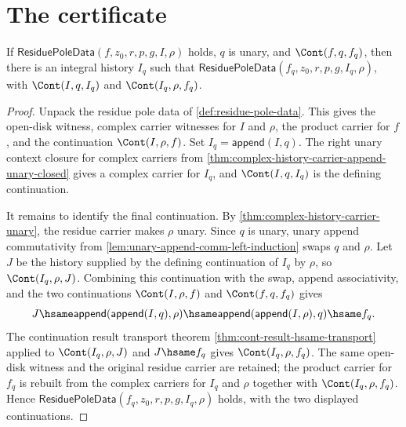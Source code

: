 \section{The certificate}
\label{sec:residue-certificate}

\begin{theorem}
\label{thm:residue-pole-data-integral-suffix-closure}
If $\mathsf{ResiduePoleData}(f,z_0,r,p,g,I,\rho)$ holds, $q$ is unary,
and $\Cont(f,q,f_q)$, then there is an integral history $I_q$ such that
$\mathsf{ResiduePoleData}(f_q,z_0,r,p,g,I_q,\rho)$, with
$\Cont(I,q,I_q)$ and $\Cont(I_q,\rho,f_q)$.
\end{theorem}
\begin{proof}
Unpack the residue pole data of \autoref{def:residue-pole-data}. This gives the
open-disk witness, complex carrier witnesses for $I$ and $\rho$, the product
carrier for $f$, and the continuation $\Cont(I,\rho,f)$. Set
$I_q=\mathsf{append}(I,q)$. The right unary context closure for complex carriers
from \autoref{thm:complex-history-carrier-append-unary-closed} gives a complex
carrier for $I_q$, and $\Cont(I,q,I_q)$ is the defining continuation.

It remains to identify the final continuation. By
\autoref{thm:complex-history-carrier-unary}, the residue carrier makes $\rho$
unary. Since $q$ is unary, unary append commutativity from
\autoref{lem:unary-append-comm-left-induction} swaps $q$ and $\rho$. Let $J$ be
the history supplied by the defining continuation of $I_q$ by $\rho$, so
$\Cont(I_q,\rho,J)$. Combining this continuation with the swap, append
associativity, and the two continuations $\Cont(I,\rho,f)$ and $\Cont(f,q,f_q)$
gives
$$
J
\hsame
\mathsf{append}(\mathsf{append}(I,q),\rho)
\hsame
\mathsf{append}(\mathsf{append}(I,\rho),q)
\hsame f_q.
$$
The continuation result transport theorem
\autoref{thm:cont-result-hsame-transport} applied to $\Cont(I_q,\rho,J)$ and
$J\hsame f_q$ gives $\Cont(I_q,\rho,f_q)$. The same open-disk witness and the
original residue carrier are retained; the product carrier for $f_q$ is rebuilt
from the complex carriers for $I_q$ and $\rho$ together with
$\Cont(I_q,\rho,f_q)$. Hence
$\mathsf{ResiduePoleData}(f_q,z_0,r,p,g,I_q,\rho)$ holds, with the two displayed
continuations.
\end{proof}

